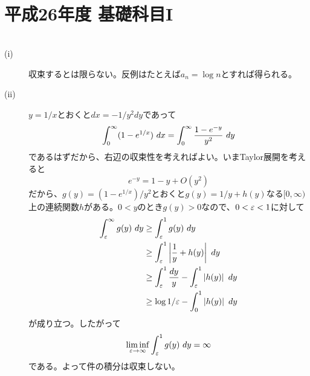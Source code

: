 \section{平成26年度 基礎科目I}

\subsubsection{}
\begin{sol} ${}$
  \begin{description}
    \item[(i)] 収束するとは限らない。反例はたとえば$a_n = \log n$とすれば得られる。
    \item[(ii)] $y=1/x$とおくと$dx = - 1/y^2 dy$であって
    \[
    \int_0^{\infty} (1 - e^{1/x}) \ dx = \int_0^{\infty} \frac{1 -e^{-y} }{ y^2} \ dy
    \]
    であるはずだから、右辺の収束性を考えればよい。いまTaylor展開を考えると
    \[
    e^{-y} = 1 -y + O(y^2)
    \]
    だから、$g(y) = (1 - e^{1/x})/ y^2 $とおくと$g(y) = 1/y + h(y)$なる$[0,\infty)$上の連続関数$h$がある。$0 < y$のとき$g(y) > 0$なので、$0 < {\varepsilon} < 1$に対して
    \begin{align*}
      \int_{\ve}^{\infty} g(y) \ dy &\geq \int_{\ve}^{1} g(y) \ dy \\
      &\geq \int_{\ve}^{1} \abs{ \f{1}{y} + h(y) } \ dy \\
      &\geq \int_{\ve}^{1} \f{dy}{y} - \int_{\ve}^{1} \abs{ h(y) } \ dy \\
      &\geq \log 1/\ve - \int_{0}^{1} \abs{ h(y) } \ dy
    \end{align*}
    が成り立つ。したがって
    \[
    \liminf_{{\varepsilon} \to \infty} \int_{{\varepsilon}}^{1} g(y) \ dy = \infty
    \]
    である。よって件の積分は収束しない。
  \end{description}
\end{sol}

\newpage


